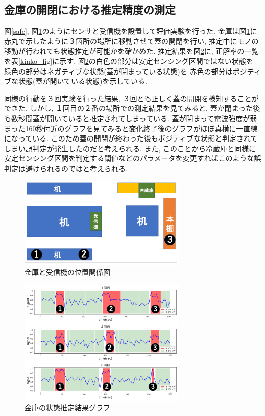 \documentclass[Japanese]{dicomopapers}
\begin{document}
\subsection{金庫の開閉における推定精度の測定}
図\ref{safe}, 図\ref{kinko_position}のようにセンサと受信機を設置して評価実験を行った.
金庫は図\ref{kinko_position}に赤丸で示したように３箇所の場所に移動させて蓋の開閉を行い, 推定中にモノの移動が行われても状態推定が可能かを確かめた.
推定結果を図\ref{kinko_graph}に, 正解率の一覧を表\ref{kinko_fig}に示す.
図\ref{kinko_graph}の白色の部分は安定センシング区間ではない状態を 緑色の部分はネガティブな状態(蓋が閉まっている状態)を 赤色の部分はポジティブな状態(蓋が開いている状態)を示している.

同様の行動を３回実験を行った結果, ３回とも正しく蓋の開閉を検知することができた.
しかし, １回目の２番の場所での測定結果を見てみると, 蓋が閉まった後も数秒間蓋が開いていると推定されてしまっている.
蓋が閉まって電波強度が弱まった160秒付近のグラフを見てみると変化終了後のグラフがほぼ真横に一直線になっている.
このため蓋の開閉が終わった後もポジティブな状態と判定されてしまい誤判定が発生したのだと考えられる.
また, このことから冷蔵庫と同様に安定センシング区間を判定する閾値などのパラメータを変更すればこのような誤判定は避けられるのではと考えられる.

\begin{figure}[ht]
    \centering
    \includegraphics[width=8cm]{kinko_position_fig.png}
    \caption{金庫と受信機の位置関係図}
    \label{kinko_position}
\end{figure}

\begin{figure}[ht]
    \centering
    \includegraphics[width=8cm]{kinko_graph.png}
    \caption{金庫の状態推定結果グラフ}
    \label{kinko_graph}
\end{figure}
\end{document}
